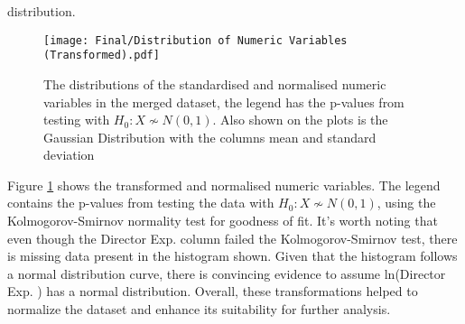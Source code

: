             distribution.
        \begin{figure}[H]
        \centering
        \texttt{[image: Final/Distribution of Numeric Variables (Transformed).pdf]}
        \caption[short]{The distributions of the standardised and normalised numeric variables in the merged dataset,
        the legend has the p-values from testing with $H_{0}: X \not\sim N(0,1)$.
        Also shown on the plots is the Gaussian Distribution with the columns mean and
            standard deviation}\label{fig-transformed-distribution-of-numeric-variable}
            \end{figure} Figure \ref{fig-transformed-distribution-of-numeric-variable}
            shows the transformed and normalised numeric variables.
        The legend contains the p-values from testing the data with $H_{0}: X \not\sim
                N(0,1)$, using the Kolmogorov-Smirnov normality test\cite{KStest} for goodness
            of fit.
        It's worth noting that even though the Director Exp.
        column failed the Kolmogorov-Smirnov test, there is missing data present in the histogram shown.
        Given that the histogram follows a normal distribution curve, there is
            convincing evidence to assume ln(Director Exp.
        ) has a normal distribution.
        Overall, these transformations helped to normalize the dataset and enhance its
            suitability for further analysis.
